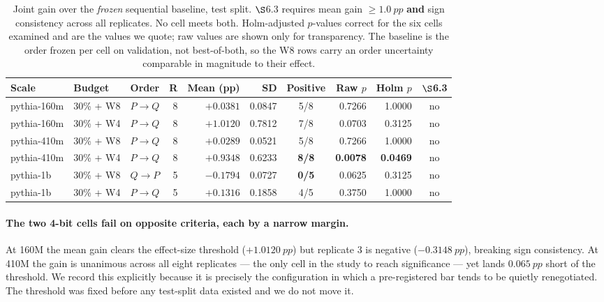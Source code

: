 \begin{table}[t]
\centering
\caption{Joint gain over the \emph{frozen} sequential baseline, test split. $\S$6.3 requires
mean gain $\geq \SI{1.0}{pp}$ \textbf{and} sign consistency across all replicates. No cell
meets both. Holm-adjusted $p$-values correct for the six cells examined and are the values we
quote; raw values are shown only for transparency. The baseline is the order frozen per cell
on validation, not best-of-both, so the W8 rows carry an order uncertainty comparable in
magnitude to their effect.}
\label{tab:main}
\small
\begin{tabular}{@{}llcrrrcrrc@{}}
\toprule
\textbf{Scale} & \textbf{Budget} & \textbf{Order} & \textbf{R} &
\textbf{Mean (pp)} & \textbf{SD} & \textbf{Positive} &
\textbf{Raw $p$} & \textbf{Holm $p$} & \textbf{$\S$6.3} \\
\midrule
pythia-160m & 30\% + W8 & $P{\to}Q$ & 8 & $+0.0381$ & 0.0847 & 5/8 & 0.7266 & 1.0000 & no \\
pythia-160m & 30\% + W4 & $P{\to}Q$ & 8 & $\mathbf{+1.0120}$ & 0.7812 & 7/8 & 0.0703 & 0.3125 & no \\
pythia-410m & 30\% + W8 & $P{\to}Q$ & 8 & $+0.0289$ & 0.0521 & 5/8 & 0.7266 & 1.0000 & no \\
pythia-410m & 30\% + W4 & $P{\to}Q$ & 8 & $\mathbf{+0.9348}$ & 0.6233 & \textbf{8/8} & \textbf{0.0078} & \textbf{0.0469} & no \\
pythia-1b   & 30\% + W8 & $Q{\to}P$ & 5 & $\mathbf{-0.1794}$ & 0.0727 & \textbf{0/5} & 0.0625 & 0.3125 & no \\
pythia-1b   & 30\% + W4 & $P{\to}Q$ & 5 & $+0.1316$ & 0.1858 & 4/5 & 0.3750 & 1.0000 & no \\
\bottomrule
\end{tabular}
\end{table}

\paragraph{The two 4-bit cells fail on opposite criteria, each by a narrow margin.} At 160M
the mean gain clears the effect-size threshold ($+\SI{1.0120}{pp}$) but replicate 3 is
negative ($-\SI{0.3148}{pp}$), breaking sign consistency. At 410M the gain is unanimous
across all eight replicates --- the only cell in the study to reach significance --- yet
lands $\SI{0.065}{pp}$ short of the threshold. We record this explicitly because it is
precisely the configuration in which a pre-registered bar tends to be quietly renegotiated.
The threshold was fixed before any test-split data existed and we do not move it.

